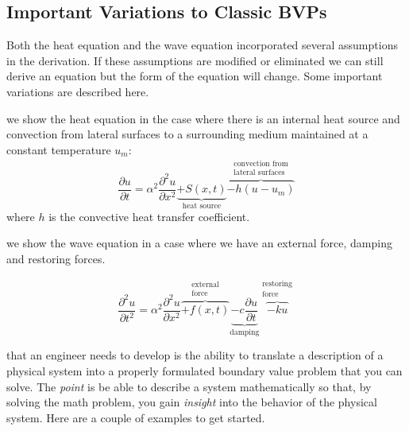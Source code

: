 \subsection{Important Variations to Classic BVPs}
Both the heat equation and the wave equation incorporated several assumptions in the derivation.  If these assumptions are modified or eliminated we can still derive an equation but the form of the equation will change.  Some important variations are described here.

 we show the heat equation in the case where there is an internal heat source and convection from lateral surfaces to a surrounding medium maintained at a constant temperature $u_m$:
\begin{equation}
\frac{\partial u}{\partial t} = \alpha^2 \frac{\partial^2 u}{\partial x^2} \underbrace{+ S(x,t)}_{\text{heat source}} \overbrace{- h(u-u_m)}^{\substack{\text{convection from} \\ \text{lateral surfaces}}}
\label{eq:heat-eq-with-variations}
\end{equation}
where $h$ is the convective heat transfer coefficient.

 we show the wave equation in a case where we have an external force, damping and restoring forces.

\begin{equation}
\frac{\partial^2 u}{\partial t^2} = \alpha^2 \frac{\partial^2 u}{\partial x^2} \overbrace{+f(x,t)}^{\substack{\text{external}\\\text{force}}} \underbrace{-c\frac{\partial u}{\partial t}}_{\text{damping}}\overbrace{-ku}^{\substack{\text{restoring}\\ \text{force}}}
\label{eq:wave-eq-with-variations}
\end{equation}

\vspace{2.0cm}

 that an engineer needs to develop is the ability to translate a description of a physical system into a properly formulated boundary value problem that you can solve.  The \emph{point} is be able to describe a system mathematically so that, by solving the math problem, you gain \emph{insight} into the behavior of the physical system.  Here are a couple of examples to get started.

